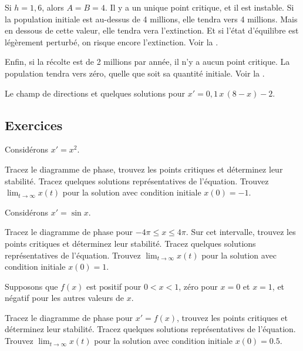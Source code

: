 Si $h = 1{,}6$, alors $A=B=4$.  Il y a un unique point critique, et il est instable.
Si la population initiale est au-dessus de 4 millions, elle tendra vers 4 millions.
Mais en dessous de cette valeur, elle tendra vera l'extinction.
Et si l'état d'équilibre est légèrement perturbé, on risque encore l'extinction. Voir la .

Enfin, si la récolte est de 2 millions par année, il n'y a aucun point critique.
La population tendra vers zéro, quelle que soit sa quantité initiale.  Voir la .

\begin{myfig}
	\capstart {}
	\caption{Le champ de directions et quelques solutions pour
	$x' = 0{,}1\,x\,(8-x)-2$.\label{2.2:harv2}}
\end{myfig}


\subsection{Exercices}

\begin{samepage}
\begin{exercise}
	Considérons $x' = x^2$.
	\begin{tasks}
		\task Tracez le diagramme de phase, trouvez les points critiques et déterminez leur stabilité.
		\task Tracez quelques solutions représentatives de l'équation.
		\task Trouvez $\displaystyle \lim_{t\to \infty} x(t)$ pour la solution avec condition initiale 	$x(0) = -1$.
	\end{tasks}
\end{exercise}
\end{samepage}

\begin{exercise}
	Considérons $x' = \sin x$.
	\begin{tasks}
		\task Tracez le diagramme de phase pour $-4\pi \leq x \leq 4\pi$.  Sur cet intervalle, trouvez les points critiques et déterminez leur stabilité.
		\task Tracez quelques solutions représentatives de l'équation.
		\task Trouvez $\displaystyle \lim_{t\to \infty} x(t)$ pour la solution avec condition initiale  $x(0) = 1$.
	\end{tasks}
\end{exercise}

\begin{exercise}
	Supposons que $f(x)$ est positif pour $0 < x < 1$, zéro pour $x=0$ et $x=1$,
	et négatif pour les autres valeurs de $x$.
	\begin{tasks}
		\task Tracez le diagramme de phase pour $x' = f(x)$, trouvez les points critiques et déterminez leur stabilité.
		\task Tracez quelques solutions représentatives de l'équation.
		\task Trouvez $\displaystyle \lim_{t\to \infty} x(t)$ pour la solution avec condition initiale $x(0) = 0.5$.
	\end{tasks}
\end{exercise}


